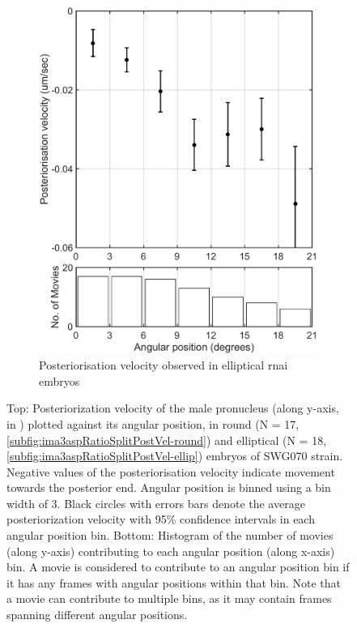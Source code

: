 \begin{figure}
\begin{subfigure}[t]{0.45\textwidth}
    \includegraphics[width=\textwidth]{Results/FigIma3RoundElliptical/imaElliptical.pdf}
    \caption{Posteriorisation velocity observed in elliptical  \ac{rnai} embryos} 
    \label{subfig:ima3aspRatioSplitPostVel-ellip}
\end{subfigure}
\caption[Comparing posteriorisation of male pronucleus between subsets of  \acs{rnai} embryos]{Top: Posteriorization velocity of the male pronucleus (along y-axis, in \si{\unitPostVel}) plotted against its angular position, in round (N = 17, \autoref{subfig:ima3aspRatioSplitPostVel-round}) and elliptical (N = 18,\autoref{subfig:ima3aspRatioSplitPostVel-ellip}) embryos of SWG070 strain. Negative values of the posteriorisation velocity indicate movement towards the posterior end. Angular position is binned using a bin width of \SI{3}{\unitAngle}. Black circles with errors bars denote the average posteriorization velocity with \num{95}\% confidence intervals in each angular position bin. Bottom: Histogram of the number of movies (along y-axis) contributing to each angular position (along x-axis) bin. A movie is considered to contribute to an angular position bin if it has any frames with angular positions within that bin. Note that a movie can contribute to multiple bins, as it may contain frames spanning different angular positions.}
\label{fig:ima3aspRatioSplitPostVel}
\end{figure}

